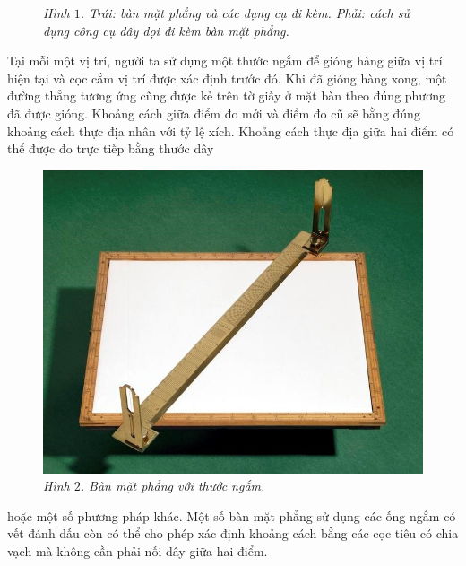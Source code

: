 \begin{multicols}{2}
\begin{figure}[H]
		\caption{\small\textit{\color{toanhocdoisong}Hình $1$. Trái: bàn mặt phẳng và các dụng cụ đi kèm. Phải: cách sử dụng công cụ dây dọi đi kèm bàn mặt phẳng.}}
		\vspace*{-10pt}
	\end{figure}
	Tại mỗi một vị trí, người ta sử dụng một thước ngắm để gióng hàng giữa vị trí hiện tại và cọc cắm vị trí được xác định trước đó.
	\vskip 0.1cm
	Khi đã gióng hàng xong, một đường thẳng tương ứng cũng được kẻ trên tờ giấy ở mặt bàn theo đúng phương đã được gióng. Khoảng cách giữa điểm đo mới và điểm đo cũ sẽ bằng đúng khoảng cách thực địa nhân với tỷ lệ xích. Khoảng cách thực địa giữa hai điểm có thể được đo trực tiếp bằng thước dây
	\begin{figure}[H]
		\vspace*{5pt}
		\centering
		\captionsetup{labelformat= empty, justification=centering}
		\includegraphics[width= 1\linewidth]{3}
		\caption{\small\textit{\color{toanhocdoisong}Hình $2$. Bàn mặt phẳng với thước ngắm.}}
		\vspace*{-10pt}
	\end{figure}
	hoặc một số phương pháp khác. Một số bàn mặt phẳng sử dụng các ống ngắm có vết đánh dấu còn có thể cho phép xác định khoảng cách bằng các cọc tiêu có chia vạch mà không cần phải nối dây giữa hai điểm. 
	\vskip 0.2cm
\end{multicols}
